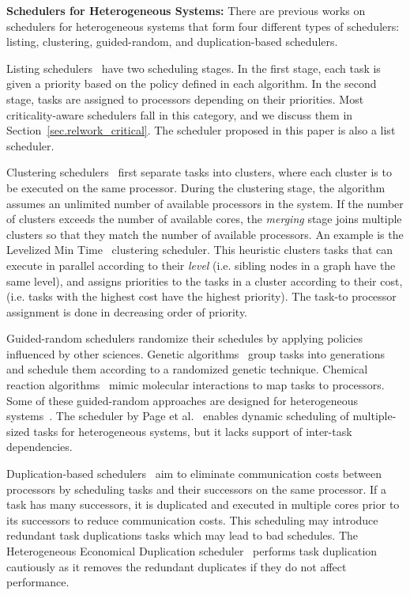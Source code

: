 \textbf{Schedulers for Heterogeneous Systems: }
There are previous works on schedulers for heterogeneous systems that form four different types of schedulers: listing, clustering, guided-random, and duplication-based schedulers.


Listing schedulers~\cite{List, DCPS, LDCP, HEFT, CrPathDup, Li2,Li5} have two scheduling stages. In the first stage, each task is given a priority based on the policy defined in each algorithm. In the second stage, tasks are assigned to processors depending on their priorities. Most criticality-aware schedulers fall in this category, and we discuss them in Section~\ref{sec.relwork_critical}. The scheduler proposed in this paper is also a list scheduler.

Clustering schedulers~\cite{Hypertool, DSC, DCPS, Hetero95} first separate tasks into clusters, where each cluster is to be executed on the same processor. During the clustering stage, the algorithm assumes an unlimited number of available processors in the system. If the number of clusters exceeds the number of available cores, the \textit{merging} stage joins multiple clusters so that they match the number of available processors. An example is the Levelized Min Time~\cite{Hetero95} clustering scheduler. This heuristic clusters tasks that can execute in parallel according to their \textit{level} (i.e. sibling nodes in a graph have the same level), and assigns priorities to the tasks in a cluster according to their cost, (i.e. tasks with the highest cost have the highest priority). The task-to processor assignment is done in decreasing order of priority.

Guided-random schedulers randomize their schedules by applying policies influenced by other sciences. Genetic algorithms~\cite{Gen07} group tasks into generations and schedule them according to a randomized genetic technique. Chemical reaction algorithms~\cite{Chemical, LiChemical} mimic molecular interactions to map tasks to processors. Some of these guided-random approaches are designed for heterogeneous systems~\cite{Gen07, Chemical}. The scheduler by Page et al.~\cite{Dyn05} enables dynamic scheduling of multiple-sized tasks for heterogeneous systems, but it lacks support of inter-task dependencies.

Duplication-based schedulers~\cite{Dup03, Dup11, Dup09} aim to eliminate communication costs between processors by scheduling tasks and their successors on the same processor. If a task has many successors, it is duplicated and executed in multiple cores prior to its successors to reduce communication costs.
This scheduling may introduce redundant task duplications tasks which may lead to bad schedules. The Heterogeneous Economical Duplication scheduler~\cite{Dup09} performs task duplication cautiously as it removes the redundant duplicates if they do not affect performance. 

